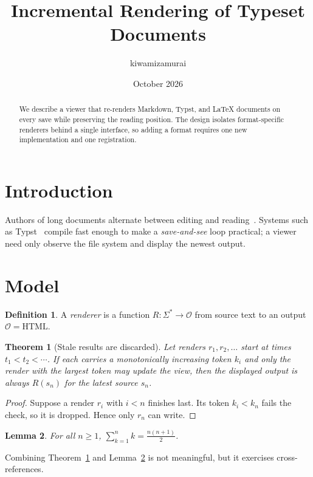 \documentclass[a4paper,11pt]{article}
\title{Incremental Rendering of Typeset Documents}
\author{kiwamizamurai}
\date{October 2026}
\newtheorem{theorem}{Theorem}
\newtheorem{lemma}[theorem]{Lemma}
\theoremstyle{definition}
\newtheorem{definition}{Definition}
\begin{document}
\maketitle

\begin{abstract}
We describe a viewer that re-renders Markdown, Typst, and \LaTeX{} documents on every save while preserving the reading position. The design isolates format-specific renderers behind a single interface, so adding a format requires one new implementation and one registration.
\end{abstract}

\tableofcontents

\section{Introduction}
Authors of long documents alternate between editing and reading~\cite{knuth1984}. Systems such as Typst~\cite{madje2023} compile fast enough to make a \emph{save-and-see} loop practical; a viewer need only observe the file system and display the newest output.

\section{Model}
\begin{definition}
A \emph{renderer} is a function $R : \Sigma^{*} \to \mathcal{O}$ from source text to an output $\mathcal{O} = \mathrm{HTML}$.
\end{definition}

\begin{theorem}[Stale results are discarded]\label{thm:stale}
Let renders $r_1, r_2, \ldots$ start at times $t_1 < t_2 < \cdots$. If each carries a monotonically increasing token $k_i$ and only the render with the largest token may update the view, then the displayed output is always $R(s_n)$ for the latest source $s_n$.
\end{theorem}
\begin{proof}
Suppose a render $r_i$ with $i < n$ finishes last. Its token $k_i < k_n$ fails the check, so it is dropped. Hence only $r_n$ can write. \qedhere
\end{proof}

\begin{lemma}\label{lem:sum}
For all $n \ge 1$, $\displaystyle\sum_{k=1}^{n} k = \frac{n(n+1)}{2}$.
\end{lemma}

Combining Theorem~\ref{thm:stale} and Lemma~\ref{lem:sum} is not meaningful, but it exercises cross-references.
\end{document}
